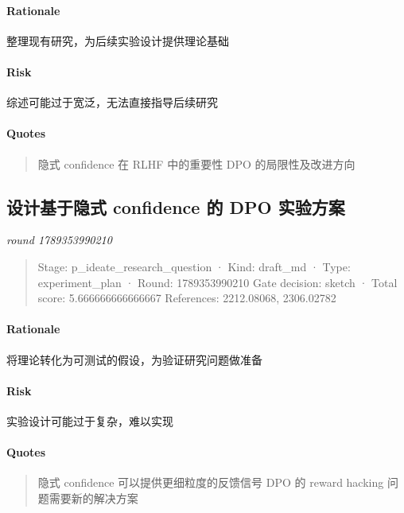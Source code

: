 \documentclass{article}
\begin{document}
\paragraph{Rationale}

整理现有研究，为后续实验设计提供理论基础

\paragraph{Risk}

综述可能过于宽泛，无法直接指导后续研究

\paragraph{Quotes}
\begin{quote}
隐式 confidence 在 RLHF 中的重要性
DPO 的局限性及改进方向
\end{quote}

\subsection{设计基于隐式 confidence 的 DPO 实验方案}
\textit{round 1789353990210}\\
\begin{quote}
Stage: p\_ideate\_research\_question  ·  Kind: draft\_md  ·  Type: experiment\_plan  ·  Round: 1789353990210
Gate decision: sketch  ·  Total score: 5.666666666666667
References: 2212.08068, 2306.02782
\end{quote}

\paragraph{Rationale}

将理论转化为可测试的假设，为验证研究问题做准备

\paragraph{Risk}

实验设计可能过于复杂，难以实现

\paragraph{Quotes}
\begin{quote}
隐式 confidence 可以提供更细粒度的反馈信号
DPO 的 reward hacking 问题需要新的解决方案
\end{quote}
\end{document}
